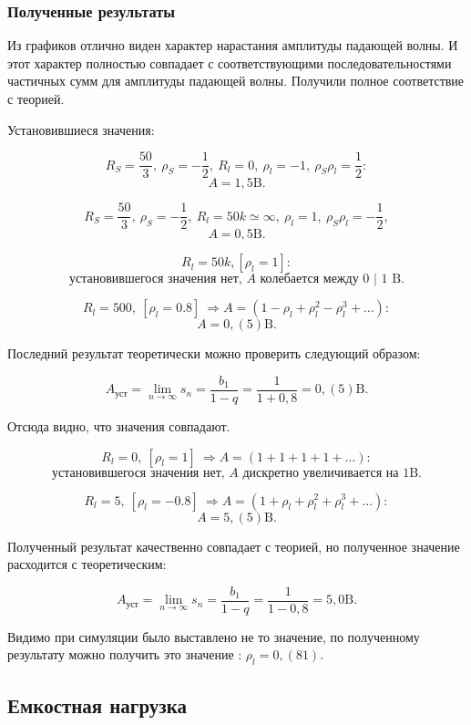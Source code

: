 \documentclass[a4paper, 14pt]{extarticle}%
\begin{document}
\subsubsection{Полученные результаты}

Из графиков отлично виден характер нарастания амплитуды падающей волны. И этот характер полностью совпадает с соответствующими последовательностями частичных сумм для амплитуды падающей волны. Получили полное соответствие с теорией.

$\textbf{Установившиеся значения:}$

\[ R_{S}=\frac{50}{3},\ \rho_{S}=-\frac{1}{2},\  R_{l}=0,\ \rho_{l}=-1,\ \rho_{S} \rho_{l}=\frac{1}{2}:\]
\[ A = 1,5 \text{B}.\]

\[R_{S}=\frac{50}{3},\ \rho_{S}=-\frac{1}{2},\  R_{l}=50k \simeq \infty,\ \rho_{l}=1,\ \rho_{S} \rho_{l}=-\frac{1}{2},\]
\[ A = 0,5 \text{B}.\]

\[ R_{l}=50 k, \left[\rho_{l}=1\right] : \]
\[ \text{установившегося значения нет, }A \text{ колебается между 0 | 1 }\text{B}.\]

\[R_{l}=500,\ \left[\rho_{l}=0.8\right] \ \Rightarrow A=\left(1-\rho_{l}+\rho_{l}^{2}-\rho_{l}^{3}+\ldots\right):\]
\[ A = 0,(5) \text{B}.\]

Последний результат теоретически можно проверить следующий образом:

\[ A_{\text{уст}} = \lim_{n \rightarrow \infty} s_n = \frac{b_1}{1 - q} = \frac{1}{1 + 0,8} = 0,(5)\text{B}.\]

Отсюда видно, что значения совпадают.

\[R_{l}=0,\ \left[\rho_{l}=1\right] \ \Rightarrow A=(1+1+1+1+\ldots): \]
\[ \text{установившегося значения нет, }A \text{ дискретно увеличивается на 1}\text{B}.\]

\[R_{l}=5, \ \left[\rho_{l}=-0.8\right] \  \Rightarrow A=\left(1+\rho_{l}+\rho_{l}^{2}+\rho_{l}^{3}+\ldots\right) : \]
\[ A = 5,(5) \text{B}.\]

Полученный результат качественно совпадает с теорией, но полученное значение расходится с теоретическим:

\[ A_{\text{уст}} = \lim_{n \rightarrow \infty} s_n = \frac{b_1}{1 - q} = \frac{1}{1 - 0,8} = 5,0 \text{B}.\]

Видимо при симуляции было выставлено не то значение, по полученному результату можно получить это значение : $\rho_l = 0,(81)$.

\subsection{Емкостная нагрузка}
\end{document}
